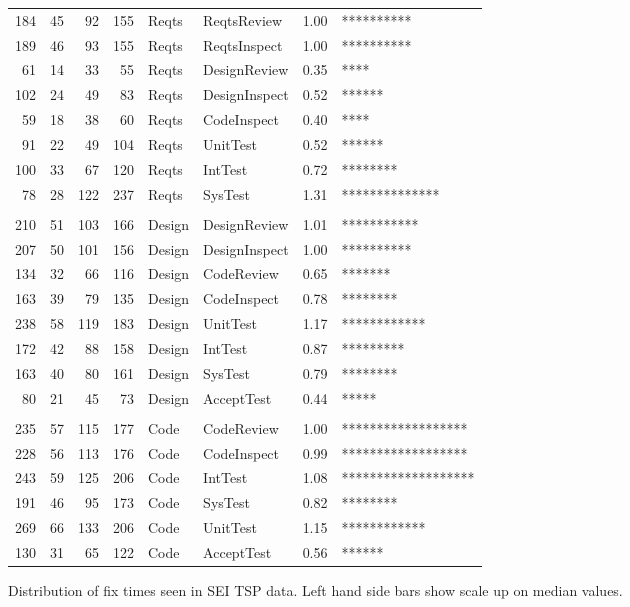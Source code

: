 \documentclass{sig-alternate}
\begin{document}
\begin{figure}[!t]
\begin{center}
\begin{tabular}{r|rrr|ll|rl}
\\
184&   45&   92&  155&Reqts&ReqtsReview &1.00 & **********  \\
189&   46&   93&  155&Reqts&ReqtsInspect &1.00 & **********  \\
 61&   14&   33&   55&Reqts&DesignReview &0.35 & ****  \\
102&   24&   49&   83&Reqts&DesignInspect &0.52 & ******  \\
 59&   18&   38&   60&Reqts&CodeInspect &0.40 & ****  \\
 91&   22&   49&  104&Reqts&UnitTest &0.52 & ******  \\
100&   33&   67&  120&Reqts&IntTest &0.72 & ********  \\
 78&   28&  122&  237&Reqts&SysTest &1.31 & **************  \\
\\
210&   51&  103&  166&Design&DesignReview &1.01 & ***********  \\
207&   50&  101&  156&Design&DesignInspect &1.00 & **********  \\
134&   32&   66&  116&Design&CodeReview &0.65 & *******  \\
163&   39&   79&  135&Design&CodeInspect &0.78 & ********  \\
238&   58&  119&  183&Design&UnitTest &1.17 & ************  \\
172&   42&   88&  158&Design&IntTest &0.87 & *********  \\
163&   40&   80&  161&Design&SysTest &0.79 & ********  \\
 80&   21&   45&   73&Design&AcceptTest &0.44 & *****  \\
 
\\
235&   57&  115&  177&Code&CodeReview &1.00 &  ******************  \\
228&   56&  113&  176&Code&CodeInspect &0.99 & ******************  \\
243&   59&  125&  206&Code&IntTest &1.08 &     *******************  \\
191&   46&   95&  173&Code&SysTest &0.82 & ******** \\
269&   66&  133&  206&Code&UnitTest &1.15 & ************  \\
130&   31&   65&  122&Code&AcceptTest &0.56 & ******  \\
 \end{tabular}
\end{center}
\caption{Distribution of fix times seen in SEI TSP data. Left hand side bars
show scale up on median values.}
\label{fig:raw}
\end{figure}
\end{document}
